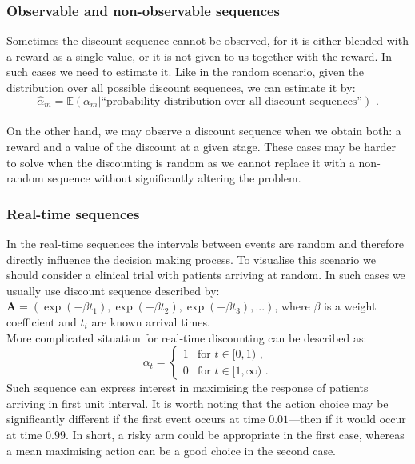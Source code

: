 \documentclass[12pt, a4paper, pdflatex, leqno, twoside]{report}
\begin{document}
\subsubsection{Observable and non-observable sequences}
Sometimes the discount sequence cannot be observed, for it is either blended with a 
reward as a single value, or it is not given to us together with the reward. In 
such cases we need to estimate it. Like in the random scenario, given the 
distribution over all possible discount sequences, we can estimate it by: 
$$
\hat{\alpha}_m = \mathbb{E}(\alpha_m | \text{``probability distribution over 
all discount sequences''}) \text{ .}
$$~\\

On the other hand, we may observe a discount sequence when we obtain both: a reward and a value of the discount at a given stage. 
These cases may be harder to solve when the discounting is random as we cannot replace it with a non-random sequence without significantly altering the problem.\\
% 

\subsubsection{Real-time sequences}
In the real-time sequences the intervals between events are random and therefore 
directly influence the decision making process. To visualise this scenario we should
consider a clinical trial with patients arriving at random. In 
such cases we usually use discount sequence described by: $\mathbf{A} = ( \exp(-\beta 
t_1), \exp(-\beta t_2), \exp(-\beta t_3),... )$, where $\beta$ is a weight 
coefficient and $t_i$ are known arrival times.\\
More complicated situation for real-time discounting can be described as:
$$
  \alpha_t =
    \begin{cases}
      1 & \text{for } t \in [0,1) \text{ ,} \\
      0 & \text{for } t \in [1,\infty) \text{ .}
    \end{cases}
$$
Such sequence can express interest in maximising the response of patients 
arriving in first unit interval. It is worth noting that the action choice may 
be significantly different if the first event occurs at time $0.01$---then if it 
would occur at time $0.99$. In short, a risky arm could be appropriate in the first 
case, whereas a mean maximising action can be a good choice in the second case.\\
\end{document}
